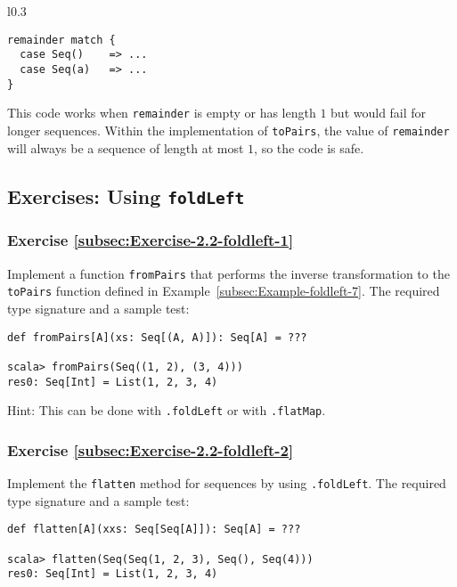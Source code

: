 \begin{wrapfigure}{l}{0.3\columnwidth}%
\vspace{-0.75\baselineskip}
\begin{lstlisting}
remainder match {
  case Seq()    => ...
  case Seq(a)   => ...
}
\end{lstlisting}

\vspace{-1.5\baselineskip}
\end{wrapfigure}%

\noindent This code works when \lstinline!remainder! is empty or
has length $1$ but would fail for longer sequences. Within the implementation
of \lstinline!toPairs!, the value of \lstinline!remainder! will
always be a sequence of length at most $1$, so the code is safe.

\subsection{Exercises: Using \texttt{foldLeft}}

\subsubsection{Exercise \label{subsec:Exercise-2.2-foldleft-1}\ref{subsec:Exercise-2.2-foldleft-1}}

Implement a function \lstinline!fromPairs! that performs the inverse
transformation to the \lstinline!toPairs! function defined in Example~\ref{subsec:Example-foldleft-7}.
The required type signature and a sample test:
\begin{lstlisting}
def fromPairs[A](xs: Seq[(A, A)]): Seq[A] = ???

scala> fromPairs(Seq((1, 2), (3, 4)))
res0: Seq[Int] = List(1, 2, 3, 4)
\end{lstlisting}

Hint: This can be done with \lstinline!.foldLeft! or with \lstinline!.flatMap!.

\subsubsection{Exercise \label{subsec:Exercise-2.2-foldleft-2}\ref{subsec:Exercise-2.2-foldleft-2}}

Implement the \lstinline!flatten! method for sequences by using \lstinline!.foldLeft!.
The required type signature and a sample test:
\begin{lstlisting}
def flatten[A](xxs: Seq[Seq[A]]): Seq[A] = ???

scala> flatten(Seq(Seq(1, 2, 3), Seq(), Seq(4)))
res0: Seq[Int] = List(1, 2, 3, 4)
\end{lstlisting}



